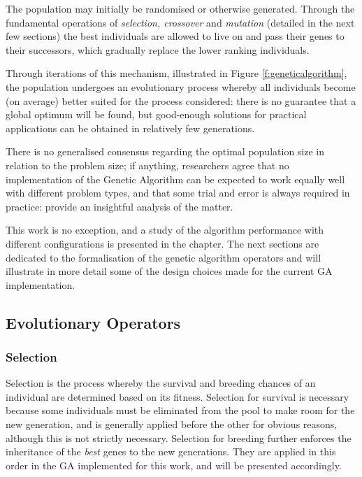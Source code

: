 The population may initially be randomised or otherwise generated. Through the fundamental operations of \emph{selection, crossover} and \emph{mutation} (detailed in the next few sections) the best individuals are allowed to live on and pass their genes to their successors, which gradually replace the lower ranking individuals.


Through iterations of this mechanism, illustrated in Figure \ref{f:geneticalgorithm}, the population undergoes an evolutionary process whereby all individuals become (on average) better suited for the process considered: there is no guarantee that a global optimum will be found, but good-enough solutions for practical applications can be obtained in relatively few generations. 

There is no generalised consensus regarding the optimal population size in relation to the problem size; if anything, researchers agree that no implementation of the Genetic Algorithm can be expected to work equally well with different problem types, and that some trial and error is always required in practice: \citep{eberhart1998comparison} provide an insightful analysis of the matter.

This work is no exception, and a study of the algorithm performance with different configurations is presented in the  chapter. The next sections are dedicated to the formalisation of the genetic algorithm operators and will illustrate in more detail some of the design choices made for the current GA implementation.

\subsection{Evolutionary Operators}
\subsubsection{Selection}
Selection is the process whereby the survival and breeding chances of an individual are determined based on its fitness. Selection for survival is necessary because some individuals must be eliminated from the pool to make room for the new generation, and is generally applied before the other for obvious reasons, although this is not strictly necessary. Selection for breeding further enforces the inheritance of the \emph{best} genes to the new generations. They are applied in this order in the GA implemented for this work, and will be presented accordingly.

